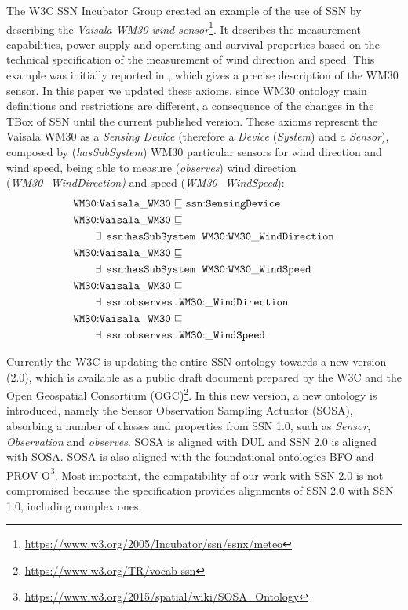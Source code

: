 \documentclass{sig-alternate-05-2015}
\newcommand{\erestr}[2]{\exists\;\,{\tt #1}\,.\,{\tt #2}}
\begin{document}
The W3C SSN Incubator Group created an example of the use of SSN by describing the \textit{Vaisala WM30 wind sensor}\footnote{\url{https://www.w3.org/2005/Incubator/ssn/ssnx/meteo}}. It describes the measurement capabilities, power supply and operating and survival properties based on the technical specification of the measurement of wind direction and speed. This example was initially reported in \cite{Compton2009}, which gives a precise description of the WM30 sensor. In this paper we updated these axioms, since WM30 ontology main definitions and restrictions are different, a consequence of the changes in the TBox of SSN until the current published version. These axioms represent the Vaisala WM30 as a \textit{Sensing Device} (therefore a \textit{Device} (\textit{System}) and a \textit{Sensor}), composed by (\textit{hasSubSystem}) WM30 particular sensors for wind direction and wind speed, being able to measure (\textit{observes}) wind direction (\textit{WM30\-\_Wind\-Direction)} and speed (\textit{WM30\-\_WindSpeed}):
\begin{align*}
  \begin{aligned}
	&\node{WM30}{Vaisala\-\_WM30} \sqsubseteq \node{ssn}{SensingDevice}\\
	&\node{WM30}{Vaisala\-\_WM30} \sqsubseteq\\
	&\qquad\erestr{\node{ssn}{hasSubSystem}}{\node{WM30}{WM30\-\_Wind\-Direction}}\\
	&\node{WM30}{Vaisala\-\_WM30} \sqsubseteq\\
	&\qquad\erestr{\node{ssn}{hasSubSystem}}{\node{WM30}{WM30\-\_WindSpeed}}\\	
	&\node{WM30}{Vaisala\-\_WM30} \sqsubseteq\\
	&\qquad\erestr{\node{ssn}{observes}}{\node{WM30}{\_WindDirection}}\\
	&\node{WM30}{Vaisala\-\_WM30} \sqsubseteq\\
	&\qquad\erestr{\node{ssn}{observes}}{\node{WM30}{\_WindSpeed}}\\
  \end{aligned}
\end{align*}

Currently the W3C is updating the entire SSN ontology towards a new version (2.0), which is available as a public draft document prepared by the W3C and the Open Geospatial Consortium (OGC)\footnote{\url{https://www.w3.org/TR/vocab-ssn}}. In this new version, a new ontology is introduced, namely the Sensor Observation Sampling Actuator (SOSA), absorbing a number of classes and properties from SSN 1.0, such as \textit{Sensor}, \textit{Observation} and \textit{observes}. SOSA is aligned with DUL and SSN 2.0 is aligned with SOSA. SOSA is also aligned with the foundational ontologies BFO and PROV-O\footnote{\url{https://www.w3.org/2015/spatial/wiki/SOSA_Ontology}}. Most important, the compatibility of our work with SSN 2.0 is not compromised because the specification provides alignments of SSN 2.0 with SSN 1.0, including complex ones.
\end{document}
